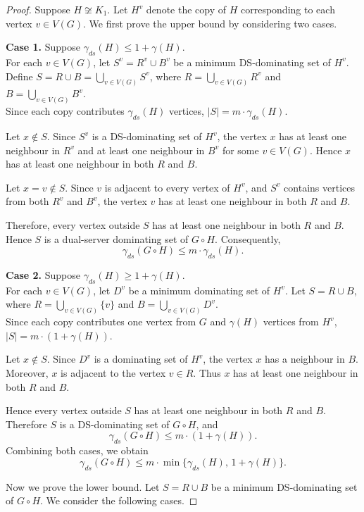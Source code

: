 \documentclass{article}
\begin{document}
\begin{proof}
Suppose $H\not\cong K_{1}$. Let $H^{v}$ denote the copy of $H$ corresponding to each vertex $v\in V(G)$. We first prove the upper bound by considering two cases.

\textbf{Case 1.} Suppose $
\gamma_{ds}(H)\le 1+\gamma(H)$.\\
For each $v\in V(G)$, let $S^{v}=R^{v}\cup B^{v}$ be a minimum DS-dominating set of $H^{v}$. Define $
S=R\cup B=\bigcup_{v\in V(G)}S^{v}$,
where $
R=\bigcup_{v\in V(G)}R^{v}$ and 
$B=\bigcup_{v\in V(G)}B^{v}$.\\
Since each copy contributes $\gamma_{ds}(H)$ vertices, $
|S|=m \cdot \gamma_{ds}(H)$.

Let $x\notin S$. Since $S^{v}$ is a DS-dominating set of $H^{v}$, the vertex $x$ has at least one neighbour in $R^{v}$ and at least one neighbour in $B^{v}$ for some $v \in V(G)$. Hence $x$ has at least one neighbour in both $R$ and $B$.

Let $x=v\notin S$. Since $v$ is adjacent to every vertex of $H^{v}$, and  $S^{v}$ contains vertices from both $R^{v}$ and $B^{v}$, the vertex $v$ has at least one neighbour in both $R$ and $B$.

Therefore, every vertex outside $S$ has at least one neighbour in both $R$ and $B$. Hence $S$ is a dual-server dominating set of $G\circ H$. Consequently,
\[
\gamma_{ds}(G\circ H)\le m \cdot \gamma_{ds}(H).
\]

\textbf{Case 2.} Suppose
$
\gamma_{ds}(H)\ge 1+\gamma(H)$.\\
For each $v\in V(G)$, let $D^{v}$ be a minimum dominating set of $H^{v}$. Let $S=R\cup B$,
where $
R=\bigcup_{v\in V(G)}\{v\}$ and 
$B=\bigcup_{v\in V(G)}D^{v}$.\\
Since each copy contributes one vertex from $G$ and $\gamma(H)$ vertices from $H^v$, $
|S|=m \cdot (1+\gamma(H))$.

Let $x\notin S$. Since $D^{v}$ is a dominating set of $H^{v}$, the vertex $x$ has a neighbour in $B$. Moreover, $x$ is adjacent to the vertex $v\in R$. Thus $x$ has at least one neighbour in both $R$ and $B$.

Hence every vertex outside $S$ has at least one neighbour in both $R$ and $B$. Therefore $S$ is a DS-dominating set of $G\circ H$, and
\[
\gamma_{ds}(G\circ H)\le m \cdot (1+\gamma(H)).
\]
Combining both cases, we obtain
\[
\gamma_{ds}(G\circ H) \leq
m \cdot \min\{\gamma_{ds}(H),\,1+\gamma(H)\}.
\]



Now we prove the lower bound. Let $S=R \cup B$ be a minimum DS-dominating set of $G\circ H$. We consider the following cases.


\end{proof}
\end{document}
